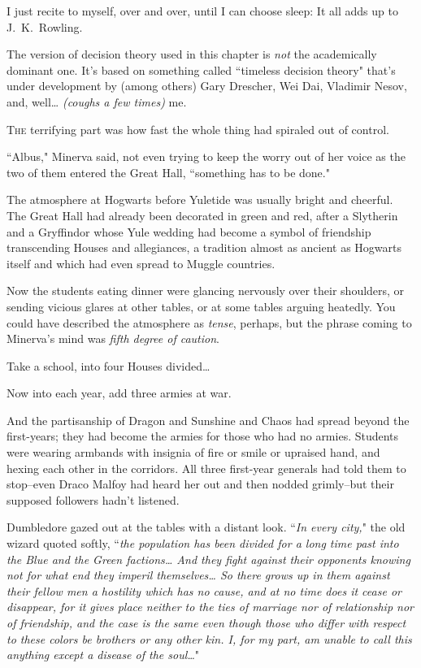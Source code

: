 
\begin{chapterOpeningAuthorNote}
I just recite to myself, over and over, until I can choose sleep: It all adds up to J.~K.~Rowling.

The version of decision theory used in this chapter is \emph{not} the academically dominant one. It's based on something called ``timeless decision theory" that's under development by (among others) Gary Drescher, Wei Dai, Vladimir Nesov, and, well{\ldots} \emph{(coughs a few times)} me.
\end{chapterOpeningAuthorNote}

\lettrine{T}{he} terrifying part was how fast the whole thing had spiraled out of control.

``Albus," Minerva said, not even trying to keep the worry out of her voice as the two of them entered the Great Hall, ``something has to be done."

The atmosphere at Hogwarts before Yuletide was usually bright and cheerful. The Great Hall had already been decorated in green and red, after a Slytherin and a Gryffindor whose Yule wedding had become a symbol of friendship transcending Houses and allegiances, a tradition almost as ancient as Hogwarts itself and which had even spread to Muggle countries.

Now the students eating dinner were glancing nervously over their shoulders, or sending vicious glares at other tables, or at some tables arguing heatedly. You could have described the atmosphere as \emph{tense}, perhaps, but the phrase coming to Minerva's mind was \emph{fifth degree of caution}.

Take a school, into four Houses divided{\ldots}

Now into each year, add three armies at war.

And the partisanship of Dragon and Sunshine and Chaos had spread beyond the first-years; they had become the armies for those who had no armies. Students were wearing armbands with insignia of fire or smile or upraised hand, and hexing each other in the corridors. All three first-year generals had told them to stop\---even Draco Malfoy had heard her out and then nodded grimly\---but their supposed followers hadn't listened.

Dumbledore gazed out at the tables with a distant look. ``\emph{In every city,}" the old wizard quoted softly, ``\emph{the population has been divided for a long time past into the Blue and the Green factions{\ldots} And they fight against their opponents knowing not for what end they imperil themselves{\ldots} So there grows up in them against their fellow men a hostility which has no cause, and at no time does it cease or disappear, for it gives place neither to the ties of marriage nor of relationship nor of friendship, and the case is the same even though those who differ with respect to these colors be brothers or any other kin. I, for my part, am unable to call this anything except a disease of the soul{\ldots}}"

